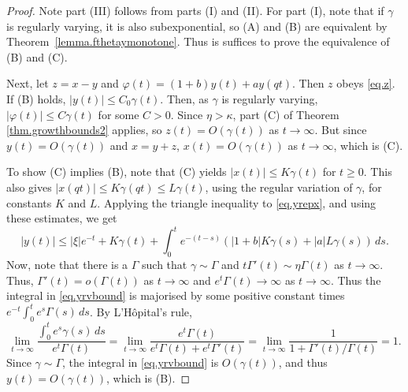 \documentclass[a4paper,10pt,reqno]{amsart}
\numberwithin{equation}{section}
\theoremstyle{definition}
\theoremstyle{remark}
\DeclareMathOperator{\1}{\mathbbm 1}
\begin{document}
	\begin{proof}
Note part (III) follows from parts (I) and (II). 
For part (I), note that if $\gamma$ is regularly varying, it is also subexponential, so (A) and (B) are equivalent by Theorem~\ref{lemma.fthetaymonotone}. Thus is suffices to prove the equivalence of (B) and (C).

Next, let $z=x-y$ and $\varphi(t)=(1+b)y(t)+ay(qt)$. Then $z$ obeys \eqref{eq.z}. If (B) holds, $|y(t)|\leq C_0\gamma(t)$. Then, as $\gamma$ is regularly varying, $|\varphi(t)|\leq C\gamma(t)$ for some $C>0$. Since $\eta>\kappa$, part (C) of Theorem \ref{thm.growthbounds2} applies, so $z(t)=O(\gamma(t))$ as $t\to\infty$. But since $y(t)=O(\gamma(t))$ and $x=y+z$,  $x(t)=O(\gamma(t))$ as $t\to\infty$, which is (C). 

To show (C) implies (B), note that (C) yields $|x(t)|\leq K\gamma(t)$ for $t\geq 0$. This also gives $|x(qt)|\leq K\gamma(qt)\leq L\gamma(t)$, using the regular variation of $\gamma$, for constants $K$ and $L$. Applying the triangle inequality to \eqref{eq.yrepx}, and using these estimates, we get 
\begin{equation} \label{eq.yrvbound}
	|y(t)|\leq |\xi|e^{-t}+K\gamma(t)+\int_0^t e^{-(t-s)}\left(|1+b|K\gamma(s)+|a|L\gamma(s)\right)\,ds.
\end{equation}
Now, note that there is a $\Gamma$ such that $\gamma\sim \Gamma$ and $t\Gamma'(t)\sim \eta\Gamma(t)$ as $t\to\infty$. Thus, $\Gamma'(t)=o(\Gamma(t))$ as $t\to\infty$ and $e^t\Gamma(t)\to\infty$ as $t\to\infty$. Thus the integral in \eqref{eq.yrvbound} is majorised by some positive constant times $e^{-t}\int_0^t e^s \Gamma(s)\,ds$. 
By L'H\^opital's rule, 
\[
\lim_{t\to\infty} \frac{\int_0^t e^s\gamma(s)\,ds}{e^t \Gamma(t)}
=\lim_{t\to\infty} \frac{e^t \Gamma(t)}{e^t\Gamma(t)+e^t\Gamma'(t)}
=\lim_{t\to\infty} \frac{1}{1+\Gamma'(t)/\Gamma(t)}=1.
\]
Since $\gamma\sim \Gamma$, the integral in \eqref{eq.yrvbound} is $O(\gamma(t))$, and thus $y(t)=O(\gamma(t))$, which is (B).


\end{proof}
\end{document}
